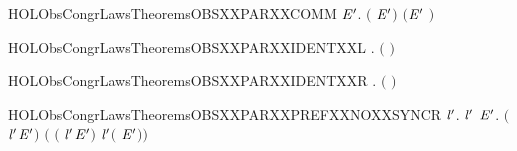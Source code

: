 \newcommand{\HOLObsCongrLawsTheoremsOBSXXPARXXASSOC}{\UseVerbatim{HOLObsCongrLawsTheoremsOBSXXPARXXASSOC}}
\begin{SaveVerbatim}{HOLObsCongrLawsTheoremsOBSXXPARXXCOMM}
\HOLTokenTurnstile{} \HOLSymConst{\HOLTokenForall{}} \ensuremath{\HOLBoundVar{E}\sp{\prime}}.  \ensuremath{(} \HOLSymConst{\ensuremath{\mid}} \ensuremath{\HOLBoundVar{E}\sp{\prime}}\ensuremath{)} \ensuremath{(}\ensuremath{\HOLBoundVar{E}\sp{\prime}} \HOLSymConst{\ensuremath{\mid}} \ensuremath{)}
\end{SaveVerbatim}
\newcommand{\HOLObsCongrLawsTheoremsOBSXXPARXXCOMM}{\UseVerbatim{HOLObsCongrLawsTheoremsOBSXXPARXXCOMM}}
\begin{SaveVerbatim}{HOLObsCongrLawsTheoremsOBSXXPARXXIDENTXXL}
\HOLTokenTurnstile{} \HOLSymConst{\HOLTokenForall{}}.  \ensuremath{(} \HOLSymConst{\ensuremath{\mid}} \ensuremath{)} 
\end{SaveVerbatim}
\newcommand{\HOLObsCongrLawsTheoremsOBSXXPARXXIDENTXXL}{\UseVerbatim{HOLObsCongrLawsTheoremsOBSXXPARXXIDENTXXL}}
\begin{SaveVerbatim}{HOLObsCongrLawsTheoremsOBSXXPARXXIDENTXXR}
\HOLTokenTurnstile{} \HOLSymConst{\HOLTokenForall{}}.  \ensuremath{(} \HOLSymConst{\ensuremath{\mid}} \ensuremath{)} 
\end{SaveVerbatim}
\newcommand{\HOLObsCongrLawsTheoremsOBSXXPARXXIDENTXXR}{\UseVerbatim{HOLObsCongrLawsTheoremsOBSXXPARXXIDENTXXR}}
\begin{SaveVerbatim}{HOLObsCongrLawsTheoremsOBSXXPARXXPREFXXNOXXSYNCR}
\HOLTokenTurnstile{} \HOLSymConst{\HOLTokenForall{}} \ensuremath{\HOLBoundVar{l}\sp{\prime}}.
        \HOLSymConst{\HOLTokenNotEqual{}}  \ensuremath{\HOLBoundVar{l}\sp{\prime}} \HOLSymConst{\HOLTokenImp{}}
       \HOLSymConst{\HOLTokenForall{}} \ensuremath{\HOLBoundVar{E}\sp{\prime}}.
            \ensuremath{(} \HOLSymConst{\ensuremath{\ldotp}} \HOLSymConst{\ensuremath{\mid}}  \ensuremath{\HOLBoundVar{l}\sp{\prime}}\HOLSymConst{\ensuremath{\ldotp}}\ensuremath{\HOLBoundVar{E}\sp{\prime}}\ensuremath{)}
             \ensuremath{(} \HOLSymConst{\ensuremath{\ldotp}}\ensuremath{(} \HOLSymConst{\ensuremath{\mid}}  \ensuremath{\HOLBoundVar{l}\sp{\prime}}\HOLSymConst{\ensuremath{\ldotp}}\ensuremath{\HOLBoundVar{E}\sp{\prime}}\ensuremath{)} \HOLSymConst{\ensuremath{+}}
               \ensuremath{\HOLBoundVar{l}\sp{\prime}}\HOLSymConst{\ensuremath{\ldotp}}\ensuremath{(} \HOLSymConst{\ensuremath{\ldotp}} \HOLSymConst{\ensuremath{\mid}} \ensuremath{\HOLBoundVar{E}\sp{\prime}}\ensuremath{)}\ensuremath{)}
\end{SaveVerbatim}
